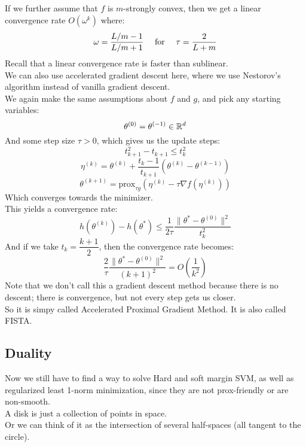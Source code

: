 \documentclass[12pt]{article}
\begin{document}
If we further assume that $f$
is $m$-strongly convex, then we
get a linear convergence rate
$O(\omega^k)$ where:
\[ \omega = \frac{L/m - 1}{L/m + 1} \quad 
\text{ for } \quad \tau = \frac{2}{L + m}\]
Recall that a linear convergence rate
is faster than sublinear. \\

We can also use accelerated gradient descent 
here, where we use Nestorov's algorithm
instead of vanilla gradient descent. \\

We again make the same assumptions
about $f$ and $g$,
and pick any starting variables:
\[ \theta^{(0)} = \theta^{(-1)} \in \mathbb{R}^d \]
And some step size $\tau > 0$,
which gives us the update steps:
\[ t_{k+1}^2 - t_{k+1} \leq t_k^2 \]
\[ \eta^{(k)} = \theta^{(k)} + 
\frac{t_k - 1}{t_{k+1}} \left( \theta^{(k)} 
- \theta^{(k-1)} \right) \]
\[ \theta^{(k+1)} = \text{prox}_{\tau g} 
\left( \eta^{(k)} - \tau \nabla f(\eta^{(k)}) 
\right)\]
Which converges towards the minimizer. \\

This yields a convergence rate:
\[ h(\theta^{(k)}) - h(\theta^*) 
\leq \frac{1}{2\tau} \frac{\|\theta^* - 
\theta^{(0)}\|^2}{t_k^2} \]
And if we take $t_k = \dfrac{k+1}{2}$,
then the convergence rate becomes:
\[ \frac{2}{\tau} \frac{\|\theta^* - 
\theta^{(0)}\|^2}{(k+1)^2} = 
O\left(\frac{1}{k^2}\right) \]
Note that we don't call this a gradient
descent method because there is no descent;
there is convergence, but not every step
gets us closer. \\

So it is simpy called Accelerated Proximal 
Gradient Method.
It is also called FISTA. \\

\newpage

\subsection*{Duality}

Now we still have to find a way to solve
Hard and soft margin SVM, as well as regularized
least 1-norm minimization,
since they are not prox-friendly or are
non-smooth. \\

A disk is just a collection of points in space. \\

Or we can think of it as the intersection of
several half-spaces (all tangent to the circle). \\
\end{document}
